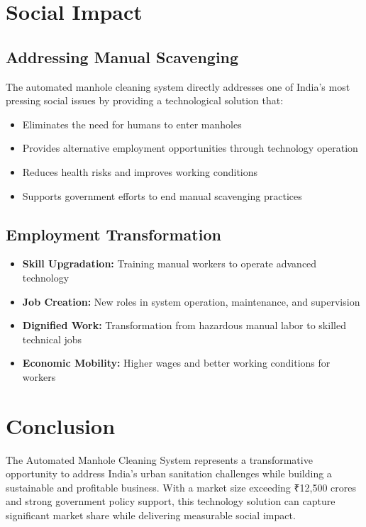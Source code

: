\documentclass[11pt,a4paper]{article}
\begin{document}
\section{Social Impact}

\subsection{Addressing Manual Scavenging}
\begin{highlight}
The automated manhole cleaning system directly addresses one of India's most pressing social issues by providing a technological solution that:
\begin{itemize}
    \item Eliminates the need for humans to enter manholes
    \item Provides alternative employment opportunities through technology operation
    \item Reduces health risks and improves working conditions
    \item Supports government efforts to end manual scavenging practices
\end{itemize}
\end{highlight}

\subsection{Employment Transformation}
\begin{itemize}[leftmargin=2em]
    \item \textbf{Skill Upgradation:} Training manual workers to operate advanced technology
    \item \textbf{Job Creation:} New roles in system operation, maintenance, and supervision
    \item \textbf{Dignified Work:} Transformation from hazardous manual labor to skilled technical jobs
    \item \textbf{Economic Mobility:} Higher wages and better working conditions for workers
\end{itemize}

\section{Conclusion}

\begin{highlight}
The Automated Manhole Cleaning System represents a transformative opportunity to address India's urban sanitation challenges while building a sustainable and profitable business. With a market size exceeding ₹12,500 crores and strong government policy support, this technology solution can capture significant market share while delivering measurable social impact.
\end{highlight}
\end{document}
